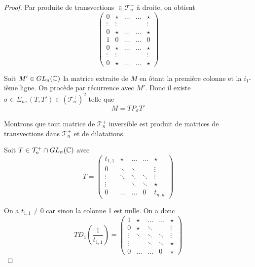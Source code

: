 \documentclass[12pt]{article}
\begin{document}
\begin{proof}
    Par produite de transvections $\in\mathcal{T}_{n}^{+}$ à droite, on obtient
    \begin{equation}
        \begin{pmatrix}
            0 & \star & \dots & \dots & \star\\
            \vdots & \vdots & & &\vdots\\
            0 & \star &\dots &\dots & \star\\
            1 & 0 &\dots & \dots& 0\\
            0 & \star & \dots& \dots&\star\\
            \vdots & \vdots & & & \vdots\\
            0 & \star & \dots & \dots & \star
        \end{pmatrix}
    \end{equation}

    Soit $M'\in GL_{n}(\mathbb{C})$ la matrice extraite de $M$ en ôtant la première colonne et la $i_{1}$-ième ligne. On procède par récurrence avec $M'$. Donc il existe $\sigma\in\Sigma_{n},(T,T')\in\left(\mathcal{T}_{n}^{+}\right)^{2}$ telle que 
    \begin{equation}
        \boxed{M=TP_{\sigma}T'}
    \end{equation}

    Montrons que tout matrice de $\mathcal{T}_{n}^{+}$ inversible est produit de matrices de transvections dans $\mathcal{T}_{n}^{+}$ et de dilatations.

    Soit $T\in\mathcal{T}_{n}^{+}\cap GL_{n}(\mathbb{C})$ avec 
    \begin{equation}
        T=
        \begin{pmatrix}
            t_{1,1}&\star &\dots & \dots& \star\\
            0 & \ddots & \ddots & & \vdots\\
            \vdots & \ddots & \ddots & \ddots & \vdots\\
            \vdots & & \ddots & \ddots & \star\\
            0 &\dots & \dots & 0 & t_{n,n}
        \end{pmatrix}
    \end{equation}

    On a $t_{1,1}\neq0$ car sinon la colonne 1 est nulle. On a donc 
    \begin{equation}
        TD_{1}\left(\frac{1}{t_{1,1}}\right)=
        \begin{pmatrix}
            1&\star &\dots & \dots& \star\\
            0 & \star & \ddots & & \vdots\\
            \vdots & \ddots & \ddots & \ddots & \vdots\\
            \vdots & & \ddots & \ddots & \star\\
            0 &\dots & \dots & 0 & \star
        \end{pmatrix}
    \end{equation}


\end{proof}
\end{document}

